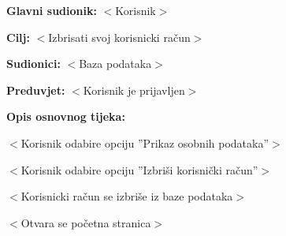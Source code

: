 					\noindent {}
					\begin{packed_item}
						
						\item \textbf{Glavni sudionik: }$<$Korisnik$>$
						\item  \textbf{Cilj:} $<$Izbrisati svoj korisnicki račun$>$
						\item  \textbf{Sudionici:} $<$Baza podataka$>$
						\item  \textbf{Preduvjet:} $<$Korisnik je prijavljen$>$
						\item  \textbf{Opis osnovnog tijeka:}
						
						\item[] \begin{packed_enum}
							
							\item $<$Korisnik odabire opciju ”Prikaz osobnih podataka”$>$
							\item $<$Korisnik odabire opciju ”Izbriši korisnički račun”$>$
							\item $<$Korisnicki račun se izbriše iz baze podataka$>$
							\item $<$Otvara se početna stranica$>$
						\end{packed_enum}

					\end{packed_item}
					
